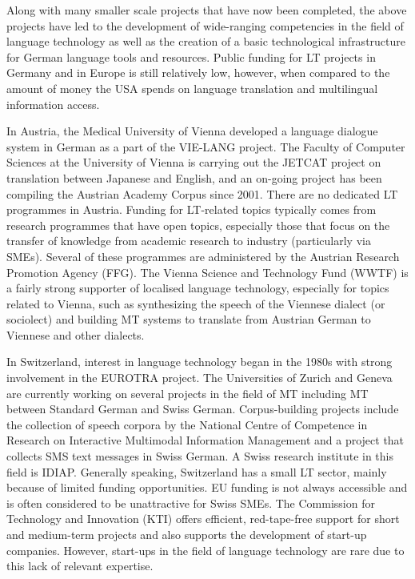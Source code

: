 \documentclass[]{../../metanetpaper}
\begin{document}
\begin{Parallel}[c]{79mm}{78mm}
{    Along with many smaller scale projects that have now been completed, the above projects have led to the development of wide-ranging competencies in the field of language technology as well as the creation of a basic technological infrastructure for German language tools and resources. Public funding for LT projects in Germany and in Europe is still relatively low, however, when compared to the amount of money the USA spends on language translation and multilingual information access\cite{laz1}. 

    In Austria, the Medical University of Vienna developed a language dialogue system in German as a part of the VIE-LANG project. The Faculty of Computer Sciences at the University of Vienna is carrying out the JETCAT project on translation between Japanese and English, and an on-going project has been compiling the Austrian Academy Corpus since 2001. There are no dedicated LT programmes in Austria. Funding for LT-related topics typically comes from research programmes that have open topics, especially those that focus on the transfer of knowledge from academic research to industry (particularly via SMEs). Several of these programmes are administered by the Austrian Research Promotion Agency (FFG). The Vienna Science and Technology Fund (WWTF) is a fairly strong supporter of localised language technology, especially for topics related to Vienna, such as synthesizing the speech of the Viennese dialect (or sociolect) and building MT systems to translate from Austrian German to Viennese and other dialects. 

    In Switzerland, interest in language technology began in the 1980s with strong involvement in the EUROTRA project. The Universities of Zurich and Geneva are currently working on several projects in the field of MT including MT between Standard German and Swiss German\cite{latl1}. Corpus-building projects include the collection of speech corpora by the National Centre of Competence in Research on Interactive Multimodal Information Management and a project that collects SMS text messages in Swiss German\cite{sor1}. A Swiss research institute in this field is IDIAP. Generally speaking, Switzerland has a small LT sector, mainly because of limited funding opportunities. EU funding is not always accessible and is often considered to be unattractive for Swiss SMEs. The Commission for Technology and Innovation (KTI) offers efficient, red-tape-free support for short and medium-term projects and also supports the development of start-up companies. However, start-ups in the field of language technology are rare due to this lack of relevant expertise.

}
\end{Parallel}
\end{document}

